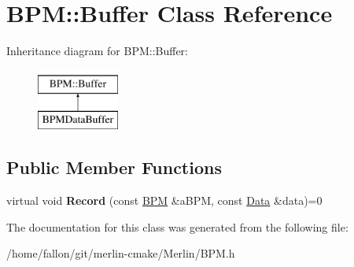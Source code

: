 \hypertarget{classBPM_1_1Buffer}{}\section{B\+PM\+:\+:Buffer Class Reference}
\label{classBPM_1_1Buffer}
Inheritance diagram for B\+PM\+:\+:Buffer\+:\begin{figure}[H]
\begin{center}
\leavevmode
\includegraphics[height=2.000000cm]{classBPM_1_1Buffer}
\end{center}
\end{figure}
\subsection*{Public Member Functions}
\begin{DoxyCompactItemize}
\item 
\mbox{\label{classBPM_1_1Buffer_a5e2ffba153542517e30ece29f1927168}} 
virtual void {\bfseries Record} (const \hyperlink{classBPM}{B\+PM} \&a\+B\+PM, const \hyperlink{structBPM_1_1Data}{Data} \&data)=0
\end{DoxyCompactItemize}


The documentation for this class was generated from the following file\+:\begin{DoxyCompactItemize}
\item 
/home/fallon/git/merlin-\/cmake/\+Merlin/B\+P\+M.\+h\end{DoxyCompactItemize}
